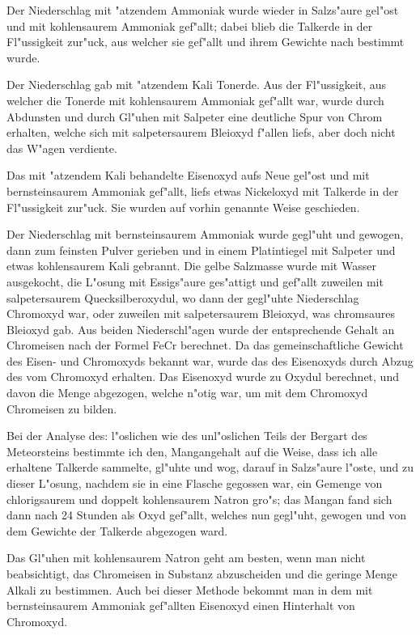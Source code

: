 \documentclass[a4paper, 11pt, oneside]{article}
\begin{document}
Der Niederschlag mit "atzendem Ammoniak wurde wieder in Salzs"aure gel"ost und mit kohlensaurem Ammoniak gef"allt; dabei blieb die Talkerde in der Fl"ussigkeit zur"uck, aus welcher sie gef"allt und ihrem Gewichte nach bestimmt wurde.

Der Niederschlag gab mit "atzendem Kali Tonerde. Aus der Fl"ussigkeit, aus welcher die Tonerde mit kohlensaurem Ammoniak gef"allt war, wurde durch Abdunsten und durch Gl"uhen mit Salpeter eine deutliche Spur von Chrom erhalten, welche sich mit salpetersaurem Bleioxyd f"allen liefs, aber doch nicht das W"agen verdiente.

Das mit "atzendem Kali behandelte Eisenoxyd aufs Neue gel"ost und mit bernsteinsaurem Ammoniak gef"allt, liefs etwas Nickeloxyd mit Talkerde in der Fl"ussigkeit zur"uck. Sie wurden auf vorhin genannte Weise geschieden.

Der Niederschlag mit bernsteinsaurem Ammoniak wurde gegl"uht und gewogen, dann zum feinsten Pulver gerieben und in einem Platintiegel mit Salpeter und etwas kohlensaurem Kali gebrannt. Die gelbe Salzmasse wurde mit Wasser ausgekocht, die L"osung mit Essigs"aure ges"attigt und gef"allt zuweilen mit salpetersaurem Quecksilberoxydul, wo dann der gegl"uhte Niederschlag Chromoxyd war, oder zuweilen mit salpetersaurem Bleioxyd, was chromsaures Bleioxyd gab. Aus beiden Niederschl"agen wurde der entsprechende Gehalt an Chromeisen nach der Formel FeCr berechnet. Da das gemeinschaftliche Gewicht des Eisen- und Chromoxyds bekannt war, wurde das des Eisenoxyds durch Abzug des vom Chromoxyd erhalten. Das Eisenoxyd wurde zu Oxydul berechnet, und davon die Menge abgezogen, welche n"otig war, um mit dem Chromoxyd Chromeisen zu bilden.

Bei der Analyse des: l"oslichen wie des unl"oslichen Teils der Bergart des Meteorsteins bestimmte ich den, Mangangehalt auf die Weise, dass ich alle erhaltene Talkerde sammelte, gl"uhte und wog, darauf in Salzs"aure l"oste, und zu dieser L"osung, nachdem sie in eine Flasche gegossen war, ein Gemenge von chlorigsaurem und doppelt kohlensaurem Natron gro"s; das Mangan fand sich dann nach 24 Stunden als Oxyd gef"allt, welches nun gegl"uht, gewogen und von dem Gewichte der Talkerde abgezogen ward.

Das Gl"uhen mit kohlensaurem Natron geht am besten, wenn man nicht beabsichtigt, das Chromeisen in Substanz abzuscheiden und die geringe Menge Alkali zu bestimmen. Auch bei dieser Methode bekommt man in dem mit bernsteinsaurem Ammoniak gef"allten Eisenoxyd einen Hinterhalt von Chromoxyd.
\end{document}
